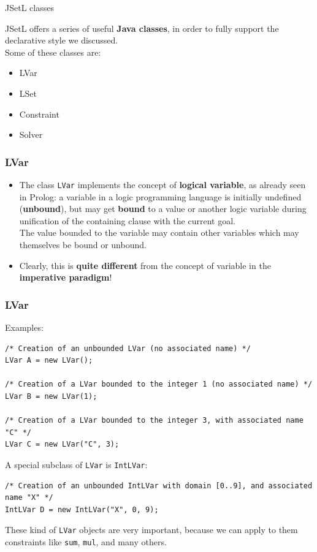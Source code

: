 \begin{frame}{JSetL classes}

JSetL offers a series of useful \textbf{Java classes}, in order to fully support the declarative style we discussed.\\
Some of these classes are:
\vspace{5mm}
\begin{itemize}
\setlength\itemsep{2em}
\item LVar
\item LSet
\item Constraint
\item Solver
\end{itemize}

\end{frame}



\begin{frame}[fragile]
\frametitle{LVar}
\begin{itemize}
\setlength\itemsep{3em}
\item The class \texttt{LVar} implements the concept of \textbf{logical variable}, as already seen in Prolog: a variable in a logic programming language is initially undefined (\textbf{unbound}), but may get \textbf{bound} to a value or another logic variable during unification of the containing clause with the current goal.\\
The value bounded to the variable may contain other variables which may themselves be bound or unbound.\\
\item Clearly, this is \textbf{quite different} from the concept of variable in the \textbf{imperative paradigm}!\\

\end{itemize}
\end{frame}

\begin{frame}[fragile]
\frametitle{LVar}
Examples:\\

\begin{lstlisting}
/* Creation of an unbounded LVar (no associated name) */
LVar A = new LVar();

/* Creation of a LVar bounded to the integer 1 (no associated name) */
LVar B = new LVar(1);

/* Creation of a LVar bounded to the integer 3, with associated name "C" */
LVar C = new LVar("C", 3);
\end{lstlisting}

A special subclass of \texttt{LVar} is \texttt{IntLVar}:
\begin{lstlisting}
/* Creation of an unbounded IntLVar with domain [0..9], and associated name "X" */
IntLVar D = new IntLVar("X", 0, 9);
\end{lstlisting}
These kind of \texttt{LVar} objects are very important, because we can apply to them constraints like \texttt{sum}, \texttt{mul}, and many others.
\end{frame}


